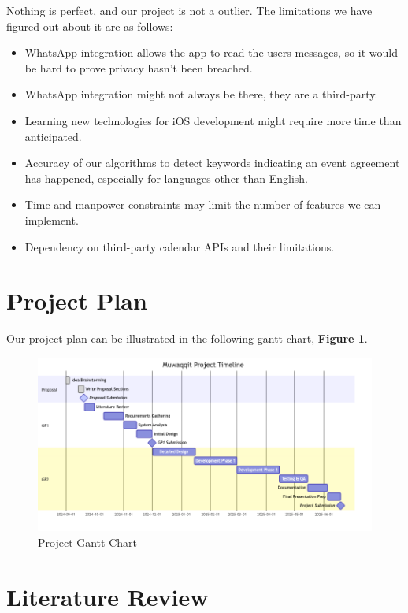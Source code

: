 \documentclass[12pt,a4paper]{article}
\begin{document}
Nothing is perfect, and our project is not a outlier. The limitations we have figured out about it are as follows:

\begin{itemize}
    \item WhatsApp integration allows the app to read the users messages, so it would be hard to prove privacy hasn't been breached.
    \item WhatsApp integration might not always be there, they are a third-party.
    \item Learning new technologies for iOS development might require more time than anticipated.
    \item Accuracy of our algorithms to detect keywords indicating an event agreement has happened, especially for languages other than English.
    \item Time and manpower constraints may limit the number of features we can implement.
    \item Dependency on third-party calendar APIs and their limitations.
\end{itemize}

\section{Project Plan}

Our project plan can be illustrated in the following gantt chart, \textbf{Figure \ref{fig:project-gantt-chart}}.

\begin{figure}[!h]
    \centering
    \includegraphics[width=\textwidth]{images/gantt.png}
    \caption{Project Gantt Chart}
    \label{fig:project-gantt-chart}
\end{figure}

\section{Literature Review}
\end{document}
